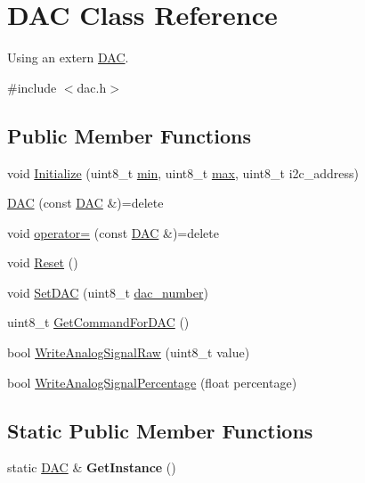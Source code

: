 \hypertarget{class_d_a_c}{}\section{D\+AC Class Reference}
\label{class_d_a_c}


Using an extern \hyperlink{class_d_a_c}{D\+AC}.  




{\ttfamily \#include $<$dac.\+h$>$}

\subsection*{Public Member Functions}
\begin{DoxyCompactItemize}
\item 
void \hyperlink{class_d_a_c_a6584c17f9f941589a78e806c10386789}{Initialize} (uint8\+\_\+t \hyperlink{class_d_a_c_aa4f21cf166374cfc6edcd412f4d2072b}{min}, uint8\+\_\+t \hyperlink{class_d_a_c_a229a81d8ebf43511dfb6815c5cd8f425}{max}, uint8\+\_\+t i2c\+\_\+address)
\item 
\hyperlink{class_d_a_c_af656669246f70c7ccbbd05d0e65088d4}{D\+AC} (const \hyperlink{class_d_a_c}{D\+AC} \&)=delete
\item 
void \hyperlink{class_d_a_c_a9e16a3d53b57588cba0ff2f9ade78e6b}{operator=} (const \hyperlink{class_d_a_c}{D\+AC} \&)=delete
\item 
void \hyperlink{class_d_a_c_a28b77e33c40384e1308168e2945d99b5}{Reset} ()
\item 
void \hyperlink{class_d_a_c_ac2fc281ed24a4bb8478519a5cc2e1177}{Set\+D\+AC} (uint8\+\_\+t \hyperlink{class_d_a_c_afb39aacc3401c892403c477f857504f8}{dac\+\_\+number})
\item 
uint8\+\_\+t \hyperlink{class_d_a_c_a535a7552ff0b9a68af94893a9c17dbed}{Get\+Command\+For\+D\+AC} ()
\item 
bool \hyperlink{class_d_a_c_a5bbcde98ffe84c740e562427a14def74}{Write\+Analog\+Signal\+Raw} (uint8\+\_\+t value)
\item 
bool \hyperlink{class_d_a_c_ab1e74700e0e44e3641e2265380c25347}{Write\+Analog\+Signal\+Percentage} (float percentage)
\end{DoxyCompactItemize}
\subsection*{Static Public Member Functions}
\begin{DoxyCompactItemize}
\item 
\hypertarget{class_d_a_c_aa97df751677eb0db87b3e3a5a1cb6049}{}\label{class_d_a_c_aa97df751677eb0db87b3e3a5a1cb6049} 
static \hyperlink{class_d_a_c}{D\+AC} \& {\bfseries Get\+Instance} ()
\end{DoxyCompactItemize}
